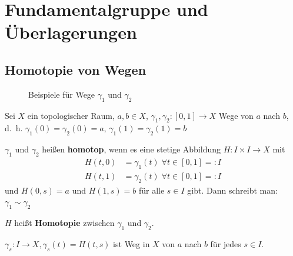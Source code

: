 \chapter{Fundamentalgruppe und Überlagerungen}
\section{Homotopie von Wegen}
\begin{figure}[ht]
    \centering
    \hspace{1em}%
    \label{fig:paths-homotop-example-counterexample}
    \caption{Beispiele für Wege $\gamma_1$ und $\gamma_2$}
\end{figure}

\begin{definition}%
    Sei $X$ ein topologischer Raum, $a, b \in X$, 
    $\gamma_1, \gamma_2: [0,1] \rightarrow X$ Wege von $a$ nach $b$,
    d.~h. $\gamma_1(0) = \gamma_2(0) = a$, $\gamma_1(1) = \gamma_2(1) = b$

    \begin{defenum}
        \item $\gamma_1$ und $\gamma_2$ heißen \textbf{homotop},
              wenn es eine stetige Abbildung $H : I \times I \rightarrow X$ mit
              \begin{align*}
                H(t,0) &= \gamma_1(t)\;\forall t \in [0,1] =: I\\
                H(t,1) &= \gamma_2(t)\;\forall t \in [0,1] =: I
              \end{align*}
              und $H(0,s) = a$ und $H(1,s) = b$ für alle $s \in I$ gibt.
              Dann schreibt man: $\gamma_1 \sim \gamma_2$

              $H$ heißt \textbf{Homotopie} zwischen
              $\gamma_1$ und $\gamma_2$.
        \item $\gamma_s: I \rightarrow X, \gamma_s(t) = H(t,s)$ ist
              Weg in $X$ von $a$ nach $b$ für jedes $s \in I$.
    \end{defenum}
\end{definition}

